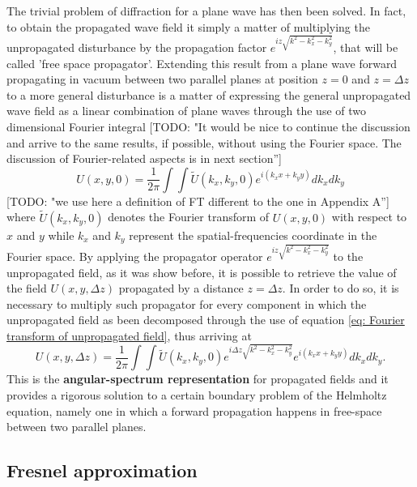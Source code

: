 \documentclass{iucr}              %
\newcommand{\todo}[1]{{\color{red}[TODO: "#1'']}}
\begin{document}
The trivial problem of diffraction for a plane wave has then been solved. In fact, to obtain the propagated wave field it simply a matter of multiplying the unpropagated disturbance by the propagation factor $e^{i z\sqrt{k^2 -k_x^2-k_y^2}}$, that will be called 'free space propagator'. Extending this result from a plane wave forward propagating in vacuum between two parallel planes at position $z=0$ and $z=\Delta z$ to a more general disturbance is a matter of expressing the general unpropagated wave field as a linear combination of plane waves through the use of two dimensional Fourier integral \todo{It would be nice to continue the discussion and arrive to the same results, if possible, without using the Fourier space. The discussion of Fourier-related aspects is in next section}
\begin{equation}\label{eq: Fourier transform of unpropagated field}
U(x, y, 0) = \frac {1}{ 2 \pi}\int \int \widetilde{U}(k_x, k_y, 0)e^{i(k_x x + k_y y)} dk_x dk_y
\end{equation} 
\todo{we use here a definition of FT different to the one in Appendix A}
where $\widetilde{U}(k_x, k_y, 0)$ denotes the Fourier transform of $U(x,y,0)$ with respect to $x$ and $y$ while $k_x$ and $k_y$ represent the spatial-frequencies coordinate in the Fourier space. By applying the propagator operator $e^{i z\sqrt{k^2 -k_x^2-k_y^2}}$ to the unpropagated field, as it was show before, it is possible to retrieve the value of the field $U(x,y,\Delta z)$ propagated by a distance $z=\Delta z$. In order to do so, it is necessary to multiply such propagator for every component in which the unpropagated field as been decomposed through the use of equation \ref{eq: Fourier transform of unpropagated field}, thus arriving at
\begin{equation}\label{eq: angular-spectrum representation}
U(x, y, \Delta z) = \frac {1}{ 2 \pi}\int \int \widetilde{U}(k_x, k_y, 0)e^{i\Delta z\sqrt{k^2 -k_x^2-k_y^2}}e^{i(k_x x + k_y y)} dk_x dk_y.
\end{equation} 
This is the \textbf{angular-spectrum representation} for propagated fields and it provides a rigorous solution to a certain boundary problem of the Helmholtz equation, namely one in which a forward propagation happens in free-space between two parallel planes. 

\subsection{Fresnel approximation}
\end{document}
